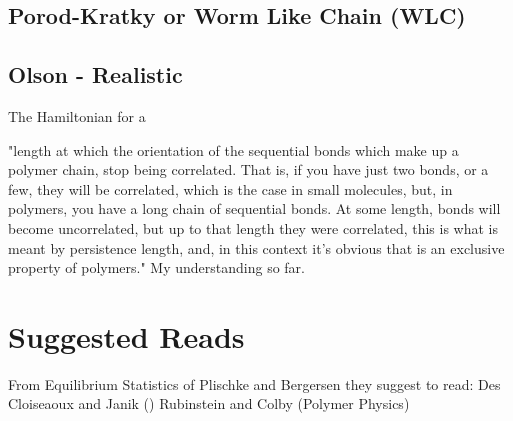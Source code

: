 \subsection{Porod-Kratky or Worm Like Chain (WLC)}

\subsection{Olson - Realistic}

The Hamiltonian for a \cite{czapla2009}






"length at which the orientation of the sequential bonds which make up
a polymer chain, stop being correlated.  That is, if you have just two
bonds, or a  few, they will be correlated, which is  the case in small
molecules,  but, in  polymers, you  have  a long  chain of  sequential
bonds. At some length, bonds  will become uncorrelated, but up to that
length  they were  correlated, this  is what  is meant  by persistence
length,  and,  in this  context  it's  obvious  that is  an  exclusive
property of polymers." My understanding so far.





\section{Suggested Reads}

From Equilibrium Statistics of Plischke and Bergersen they suggest to
read:
Des Cloiseaoux and Janik ()
Rubinstein and Colby (Polymer Physics)

